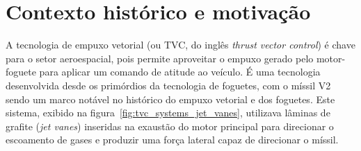 \section{Contexto histórico e motivação}


A tecnologia de empuxo vetorial (ou TVC, do inglês \textit{thrust vector control}) é chave para o setor aeroespacial, pois permite aproveitar o empuxo gerado pelo motor-foguete para aplicar um comando de atitude ao veículo. É uma tecnologia desenvolvida desde os primórdios da tecnologia de foguetes, com o míssil V2 sendo um marco notável no histórico do empuxo vetorial e dos foguetes. Este sistema, exibido na figura~\ref{fig:tvc_systems_jet_vanes}, utilizava lâminas de grafite (\textit{jet vanes}) inseridas na exaustão do motor principal para direcionar o escoamento de gases e produzir uma força lateral capaz de direcionar o míssil.

